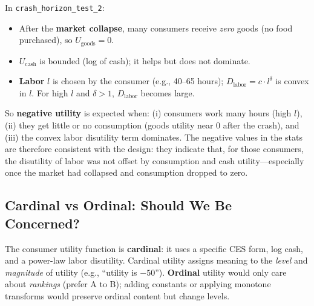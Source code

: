 \documentclass{article}
\begin{document}
In \texttt{crash\_horizon\_test\_2}:
\begin{itemize}
    \item After the \textbf{market collapse}, many consumers receive \emph{zero} goods (no food purchased), so \(U_{\text{goods}} = 0\).
    \item \(U_{\text{cash}}\) is bounded (log of cash); it helps but does not dominate.
    \item \textbf{Labor} \(l\) is chosen by the consumer (e.g., 40--65 hours); \(D_{\text{labor}} = c \cdot l^\delta\) is convex in \(l\). For high \(l\) and \(\delta > 1\), \(D_{\text{labor}}\) becomes large.
\end{itemize}

So \textbf{negative utility} is expected when: (i) consumers work many hours (high \(l\)), (ii) they get little or no consumption (goods utility near 0 after the crash), and (iii) the convex labor disutility term dominates. The negative values in the stats are therefore consistent with the design: they indicate that, for those consumers, the disutility of labor was not offset by consumption and cash utility---especially once the market had collapsed and consumption dropped to zero.

\subsection{Cardinal vs Ordinal: Should We Be Concerned?}

The consumer utility function is \textbf{cardinal}: it uses a specific CES form, log cash, and a power-law labor disutility. Cardinal utility assigns meaning to the \emph{level} and \emph{magnitude} of utility (e.g., ``utility is \(-50\)''). \textbf{Ordinal} utility would only care about \emph{rankings} (prefer A to B); adding constants or applying monotone transforms would preserve ordinal content but change levels.
\end{document}
